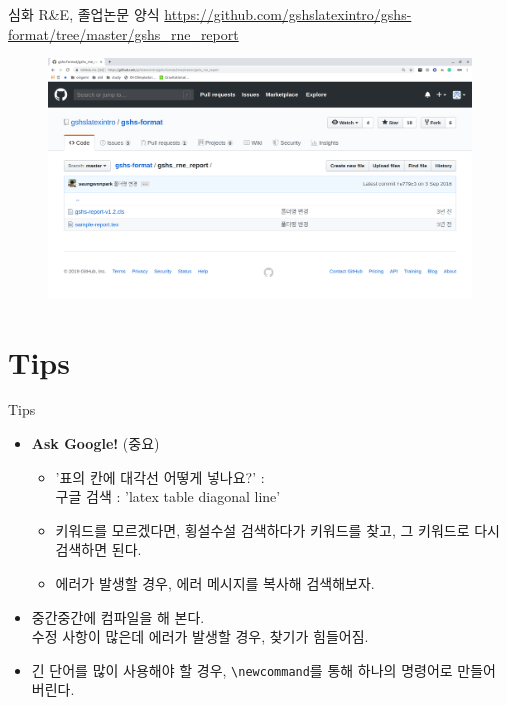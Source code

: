 \documentclass[12pt]{gshs_lecture}
\begin{document}
\begin{frame}[t]{심화 R\&E, 졸업논문 양식}
	\url{https://github.com/gshslatexintro/gshs-format/tree/master/gshs_rne_report}
	\begin{figure}[h]
		\includegraphics[width=\textwidth]{./pictures/github2.png}
	\end{figure}
\end{frame}

\section{Tips}

\begin{frame}[t]{Tips}
	
	\begin{itemize}
		\item \textbf{Ask Google!} (중요)
		\begin{itemize}
			\item '표의 칸에 대각선 어떻게 넣나요?' : \\
			구글 검색 : 'latex table diagonal line'
			\item 키워드를 모르겠다면, 횡설수설 검색하다가 키워드를 찾고, 그 키워드로 다시 검색하면 된다.
			\item 에러가 발생할 경우, 에러 메시지를 복사해 검색해보자.
		\end{itemize}
		\vskip 1pc
		
		\item 중간중간에 컴파일을 해 본다. \\
		수정 사항이 많은데 에러가 발생할 경우, 찾기가 힘들어짐.
		\vskip 1pc
		\item 긴 단어를 많이 사용해야 할 경우, \texttt{\textbackslash newcommand}를 통해 하나의 명령어로 만들어 버린다.
	\end{itemize}
	
\end{frame}
\end{document}
